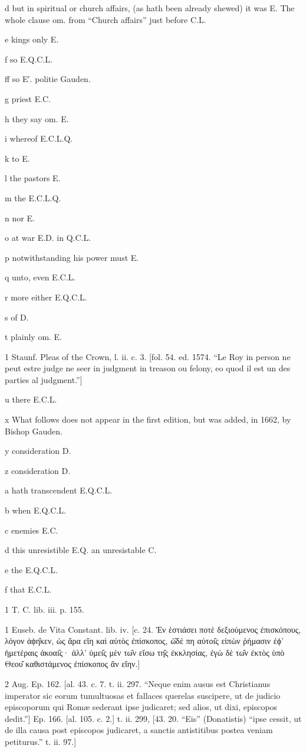 d
but in spiritual or church affairs, (as hath been already shewed) it was E. The whole clause om. from “Church affairs” just before C.L.

e
kings only E.

f
so E.Q.C.L.

ff
so E′. politie Gauden.

g
priest E.C.

h
they say om. E.

i
whereof E.C.L.Q.

k
to E.

l
the pastors E.

m
the E.C.L.Q.

n
nor E.

o
at war E.D. in Q.C.L.

p
notwithstanding his power must E.

q
unto, even E.C.L.

r
more either E.Q.C.L.

s
of D.

t
plainly om. E.

1
Staunf. Pleas of the Crown, l. ii. c. 3. [fol. 54. ed. 1574. “Le Roy in person ne peut estre judge ne seer in judgment in treason ou felony, eo quod il est un des parties al judgment.”]

u
there E.C.L.

x
What follows does not appear in the first edition, but was added, in 1662, by Bishop Gauden.

y
consideration D.

z
consideration D.

a
hath transcendent E.Q.C.L.

b
when E.Q.C.L.

c
enemies E.C.

d
this unresistible E.Q. an unresistable C.

e
the E.Q.C.L.

f
that E.C.L.

1
T. C. lib. iii. p. 155.

1
Euseb. de Vita Constant. lib. iv. [c. 24. Ἐν ἑστιάσει ποτὲ δεξιούμενος ἐπισκόπους, λόγον ἀϕη̑κεν, ὡς ἄρα εἴη καὶ αὐτὸς ἐπίσκοπος, ὡ̑δέ πη αὐτοι̑ς εἰπὼν ῥήμασιν ἐϕ’ ἡμετέραις ἀκοαι̑ς· ἀλλ’ ὑμει̑ς μὲν τω̑ν εἴσω τη̑ς ἐκκλησίας, ἐγὼ δὲ τω̑ν ἐκτὸς ὑπὸ Θεου̑ καθιστάμενος ἐπίσκοπος ἂν εἴην.]

2
Aug. Ep. 162. [al. 43. c. 7. t. ii. 297. “Neque enim ausus est Christianus imperator sic eorum tumultuosas et fallaces querelas suscipere, ut de judicio episcoporum qui Romæ sederant ipse judicaret; sed alios, ut dixi, episcopos dedit.”] Ep. 166. [al. 105. c. 2.] t. ii. 299, [43. 20. “Eis” (Donatistis) “ipse cessit, ut de illa causa post episcopos judicaret, a sanctis antistitibus postea veniam petiturus.” t. ii. 97.]

